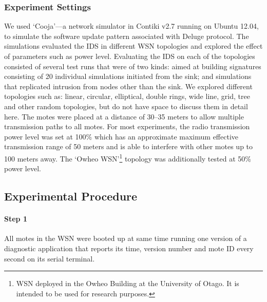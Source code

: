 \documentclass{CRPITStyle}
\begin{document}
\subsubsection*{Experiment Settings}
\label{subsec:sim_env} 
We used `Cooja'---a %
 network simulator in Contiki v2.7 running on Ubuntu 12.04, to simulate the software update pattern associated with Deluge protocol.
The simulations evaluated the IDS in different WSN topologies and explored the effect of parameters such as power level.
Evaluating the IDS on each of the topologies consisted of several test runs that  were of two kinds: 
aimed at building signatures consisting of 20 individual simulations initiated from the sink; and
simulations that replicated intrusion from nodes other than the sink.
We explored different  topologies such as: linear, circular, elliptical, double rings, wide line, grid, tree and other random topologies, but do not have space to discuss them in detail here. %
The motes were placed at a distance of 30--35 meters to allow  multiple transmission paths to all motes. 
For most experiments, the radio transmission power level was set at 100\% which has an approximate maximum effective transmission range of 50 meters and is able to interfere with other motes up to 100 meters away.
The `Owheo WSN'\footnote{WSN deployed in the Owheo Building at the University of Otago. It is intended to be used for research purposes.} topology was additionally tested at 50\% power level.%

\subsection*{Experimental Procedure}
\label{subsec:proc}
\paragraph*{Step 1} All motes in the WSN were booted up at same time running one version of a diagnostic application that reports its time, version number and mote ID every second on its serial terminal. 
\end{document}
